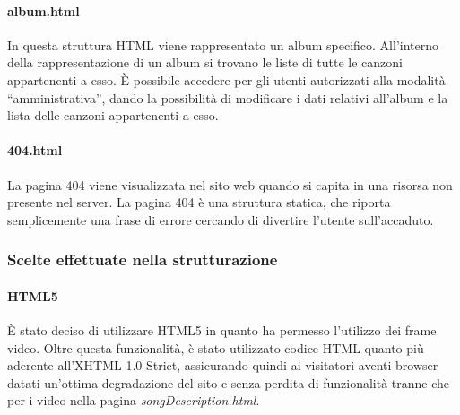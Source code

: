 \paragraph*{album.html} In questa struttura HTML viene rappresentato un album specifico. All'interno della rappresentazione di un album si trovano le liste di tutte le canzoni appartenenti a esso. È possibile accedere per gli utenti autorizzati alla modalità ``amministrativa'', dando la possibilità di modificare i dati relativi all'album e la lista delle canzoni appartenenti a esso. %

\paragraph*{404.html} La pagina 404 viene visualizzata nel sito web quando si capita in una risorsa non presente nel server. La pagina 404 è una struttura statica, che riporta semplicemente una frase di errore cercando di divertire l'utente sull'accaduto.

\subsubsection{Scelte effettuate nella strutturazione}

\paragraph{HTML5}
È stato deciso di utilizzare HTML5 in quanto ha permesso l'utilizzo dei frame video. Oltre questa funzionalità, è stato utilizzato codice HTML quanto più aderente all'XHTML 1.0 Strict, assicurando quindi ai visitatori aventi browser datati un'ottima degradazione del sito e senza perdita di funzionalità tranne che per i video nella pagina \textit{songDescription.html}.
